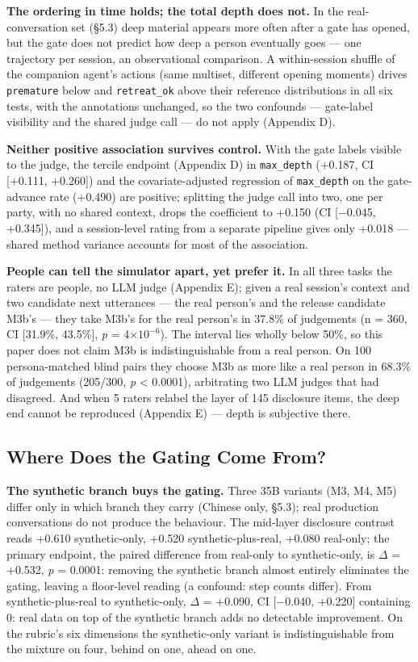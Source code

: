 \documentclass[letterpaper]{article}
\begin{document}
\textbf{The ordering in time holds; the total depth does not.} In the real-conversation set (\S{}5.3) deep material appears more often after a gate has opened, but the gate does not predict how deep a person eventually goes --- one trajectory per session, an observational comparison. A within-session shuffle of the companion agent's actions (same multiset, different opening moments) drives \texttt{premature} below and \texttt{retreat\_ok} above their reference distributions in all six tests, with the annotations unchanged, so the two confounds --- gate-label visibility and the shared judge call --- do not apply (Appendix D).

\textbf{Neither positive association survives control.} With the gate labels visible to the judge, the tercile endpoint (Appendix D) in \texttt{max\_depth} (+0.187, CI [+0.111, +0.260]) and the covariate-adjusted regression of \texttt{max\_depth} on the gate-advance rate (+0.490) are positive; splitting the judge call into two, one per party, with no shared context, drops the coefficient to +0.150 (CI [$-$0.045, +0.345]), and a session-level rating from a separate pipeline gives only +0.018 --- shared method variance accounts for most of the association.

\textbf{People can tell the simulator apart, yet prefer it.} In all three tasks the raters are people, no LLM judge (Appendix E); given a real session's context and two candidate next utterances --- the real person's and the release candidate M3b's --- they take M3b's for the real person's in 37.8\% of judgements (n = 360, CI [31.9\%, 43.5\%], \textit{p} = 4$\times 10^{-6}$). The interval lies wholly below 50\%, so this paper does not claim M3b is indistinguishable from a real person. On 100 persona-matched blind pairs they choose M3b as more like a real person in 68.3\% of judgements (205/300, \textit{p} < 0.0001), arbitrating two LLM judges that had disagreed. And when 5 raters relabel the layer of 145 disclosure items, the deep end cannot be reproduced (Appendix E) --- depth is subjective there.


\subsection{Where Does the Gating Come From?}

\textbf{The synthetic branch buys the gating.} Three 35B variants (M3, M4, M5) differ only in which branch they carry (Chinese only, \S{}5.3); real production conversations do not produce the behaviour. The mid-layer disclosure contrast reads +0.610 synthetic-only, +0.520 synthetic-plus-real, +0.080 real-only; the primary endpoint, the paired difference from real-only to synthetic-only, is $\Delta$ = +0.532, \textit{p} = 0.0001: removing the synthetic branch almost entirely eliminates the gating, leaving a floor-level reading (a confound: step counts differ). From synthetic-plus-real to synthetic-only, $\Delta$ = +0.090, CI [$-$0.040, +0.220] containing 0: real data on top of the synthetic branch adds no detectable improvement. On the rubric's six dimensions the synthetic-only variant is indistinguishable from the mixture on four, behind on one, ahead on one.
\end{document}
